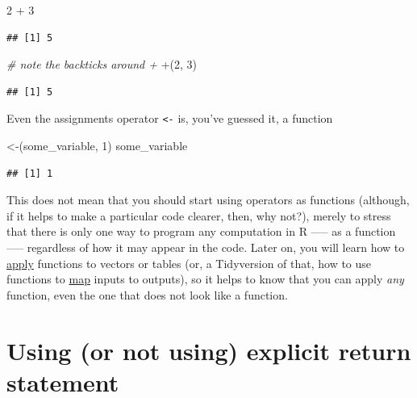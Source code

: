 \documentclass[
]{book}
\newenvironment{Shaded}{\begin{snugshade}}{\end{snugshade}}
\newcommand{\AttributeTok}[1]{\textcolor[rgb]{0.77,0.63,0.00}{#1}}
\newcommand{\CommentTok}[1]{\textcolor[rgb]{0.56,0.35,0.01}{\textit{#1}}}
\newcommand{\DecValTok}[1]{\textcolor[rgb]{0.00,0.00,0.81}{#1}}
\newcommand{\NormalTok}[1]{#1}
\newcommand{\SpecialCharTok}[1]{\textcolor[rgb]{0.00,0.00,0.00}{#1}}
\newcommand{\StringTok}[1]{\textcolor[rgb]{0.31,0.60,0.02}{#1}}
\begin{document}
\begin{Shaded}
\begin{Highlighting}[]
\DecValTok{2} \SpecialCharTok{+} \DecValTok{3}
\end{Highlighting}
\end{Shaded}

\begin{verbatim}
## [1] 5
\end{verbatim}

\begin{Shaded}
\begin{Highlighting}[]
\CommentTok{\# note the \textasciigrave{}backticks\textasciigrave{} around +}
\StringTok{\textasciigrave{}}\AttributeTok{+}\StringTok{\textasciigrave{}}\NormalTok{(}\DecValTok{2}\NormalTok{, }\DecValTok{3}\NormalTok{)}
\end{Highlighting}
\end{Shaded}

\begin{verbatim}
## [1] 5
\end{verbatim}

Even the assignments operator \texttt{\textless{}-} is, you've guessed it, a function

\begin{Shaded}
\begin{Highlighting}[]
\StringTok{\textasciigrave{}}\AttributeTok{\textless{}{-}}\StringTok{\textasciigrave{}}\NormalTok{(some\_variable, }\DecValTok{1}\NormalTok{)}
\NormalTok{some\_variable}
\end{Highlighting}
\end{Shaded}

\begin{verbatim}
## [1] 1
\end{verbatim}

This does not mean that you should start using operators as functions (although, if it helps to make a particular code clearer, then, why not?), merely to stress that there is only one way to program any computation in R ----- as a function ----- regardless of how it may appear in the code. Later on, you will learn how to \href{https://stat.ethz.ch/R-manual/R-devel/library/base/html/apply.html}{apply} functions to vectors or tables (or, a Tidyversion of that, how to use functions to \href{https://purrr.tidyverse.org/}{map} inputs to outputs), so it helps to know that you can apply \emph{any} function, even the one that does not look like a function.

\hypertarget{using-or-not-using-explicit-return-statement}{%
\section{Using (or not using) explicit return statement}\label{using-or-not-using-explicit-return-statement}}
\end{document}
